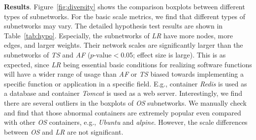 \documentclass[sigconf]{acmart}
\begin{document}
\smallskip
\noindent\textbf{Results}. 
Figure~\ref{fig:diversity} shows the comparison boxplots between different types of subnetworks. %
For the basic scale metrics, we find that 
different types of subnetworks may vary. 
The detailed hypothesis test results are shown in Table~\ref{tab:hypo}. 
Especially, the subnetworks of \emph{LR} have more nodes, more edges, and larger weights. Their network scales are significantly larger than the subnetworks of \emph{TS} and \emph{AF} ($p$-value$<$0.05; effect size is large). 
This is as expected, since \emph{LR} being essential basic conditions for realizing software functions will have a wider range of usage than \emph{AF} or \emph{TS} biased towards implementing a specific function or application in a specific field. E.g., container \emph{Redis} is used as a database and container \emph{Tomcat} is used as a web server. 
Interestingly, we find there are several outliers in the boxplots of \emph{OS} subnetworks. We manually check and find that
those 
abnormal containers are extremely popular even compared with other \emph{OS} containers, e.g., \emph{Ubuntu} and \emph{alpine}. 
However, the scale differences between \emph{OS} and \emph{LR} are not significant.
\end{document}

